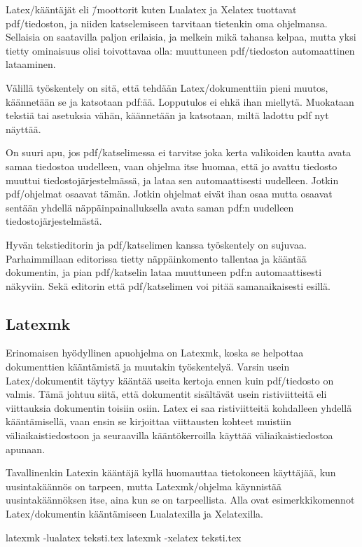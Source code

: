 Latex\-/kääntäjät eli \=/moottorit kuten Lualatex ja Xelatex tuottavat
pdf\-/tiedoston, ja niiden katselemiseen tarvitaan tietenkin oma
ohjelmansa. Sellaisia on saatavilla paljon erilaisia, ja melkein mikä
tahansa kelpaa, mutta yksi tietty ominaisuus olisi toivottavaa olla:
muuttuneen pdf\-/tiedoston automaattinen lataaminen.

Välillä työskentely on sitä, että tehdään Latex\-/dokumenttiin pieni
muutos, käännetään se ja katsotaan pdf:ää. Lopputulos ei ehkä ihan
miellytä. Muokataan tekstiä tai asetuksia vähän, käännetään ja
katsotaan, miltä ladottu pdf nyt näyttää.

On suuri apu, jos pdf\-/katselimessa ei tarvitse joka kerta valikoiden
kautta avata samaa tiedostoa uudelleen, vaan ohjelma itse huomaa, että
jo avattu tiedosto muuttui tiedostojärjestelmässä, ja lataa sen
automaattisesti uudelleen. Jotkin pdf\-/ohjelmat osaavat tämän. Jotkin
ohjelmat eivät ihan osaa mutta osaavat sentään yhdellä
näppäinpainalluksella avata saman pdf:n uudelleen
tiedostojärjestelmästä.

Hyvän tekstieditorin ja pdf\-/katselimen kanssa työskentely on sujuvaa.
Parhaimmillaan editorissa tietty näppäinkomento tallentaa ja kääntää
dokumentin, ja pian pdf\-/katselin lataa muuttuneen pdf:n
automaattisesti näkyviin. Sekä editorin että pdf\-/katselimen voi pitää
samanaikaisesti esillä.

\subsection{Latexmk}
\label{luku:latexmk}

Erinomaisen hyödyllinen apuohjelma on Latexmk, koska se helpottaa
dokumenttien kääntämistä ja muutakin työskentelyä. Varsin usein
Latex\-/dokumentit täytyy kääntää useita kertoja ennen kuin
pdf\-/tiedosto on valmis. Tämä johtuu siitä, että dokumentit sisältävät
usein ristiviitteitä eli viittauksia dokumentin toisiin osiin. Latex ei
saa ristiviitteitä kohdalleen yhdellä kääntämisellä, vaan ensin se
kirjoittaa viittausten kohteet muistiin väliaikaistiedostoon ja
seuraavilla kääntökerroilla käyttää väliaikaistiedostoa apunaan.

Tavallinenkin Latexin kääntäjä kyllä huomauttaa tietokoneen käyttäjää,
kun uusintakäännös on tarpeen, mutta Latexmk\-/ohjelma käynnistää
uusintakäännöksen itse, aina kun se on tarpeellista. Alla ovat
esimerkkikomennot Latex\-/dokumentin kääntämiseen Lualatexilla ja
Xelatexilla.

\begin{koodilohkosis}
  latexmk -lualatex teksti.tex
  latexmk -xelatex  teksti.tex
\end{koodilohkosis}

